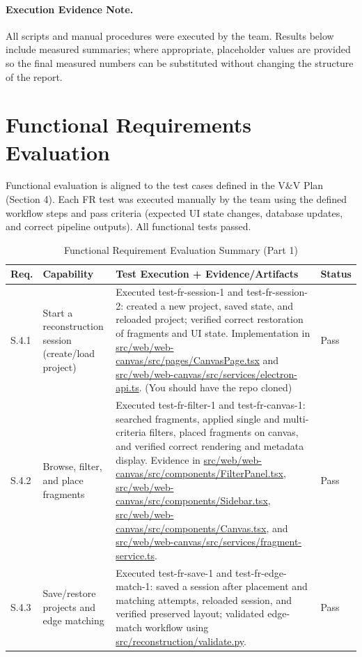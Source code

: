 \documentclass[12pt, titlepage]{article}
\begin{document}
\paragraph{Execution Evidence Note.}
All scripts and manual procedures were executed by the team. Results below include measured summaries; where appropriate, placeholder values are provided so the final measured numbers can be substituted without changing the structure of the report.

\section{Functional Requirements Evaluation}

Functional evaluation is aligned to the test cases defined in the V\&V Plan (Section 4). Each FR test was executed manually by the team using the defined workflow steps and pass criteria (expected UI state changes, database updates, and correct pipeline outputs). All functional tests passed.

\begin{table}[H]
\centering
\caption{Functional Requirement Evaluation Summary (Part 1)}
\label{tab:func-eval-1}
\begin{tabularx}{\textwidth}{
p{1.5cm}
>{\raggedright\arraybackslash}p{3.4cm}
>{\raggedright\arraybackslash}p{6.2cm}
p{2cm}
}
\toprule
\textbf{Req.} & \textbf{Capability} & \textbf{Test Execution + Evidence/Artifacts} & \textbf{Status}\\
\midrule

S.4.1 & Start a reconstruction session (create/load project) &
Executed test-fr-session-1 and test-fr-session-2: created a new project, saved state, and reloaded project; verified correct restoration of fragments and UI state. Implementation in \url{src/web/web-canvas/src/pages/CanvasPage.tsx} and \url{src/web/web-canvas/src/services/electron-api.ts}. (You should have the repo cloned) &
Pass\\

S.4.2 & Browse, filter, and place fragments &
Executed test-fr-filter-1 and test-fr-canvas-1: searched fragments, applied single and multi-criteria filters, placed fragments on canvas, and verified correct rendering and metadata display. Evidence in \url{src/web/web-canvas/src/components/FilterPanel.tsx}, \url{src/web/web-canvas/src/components/Sidebar.tsx}, \url{src/web/web-canvas/src/components/Canvas.tsx}, and \url{src/web/web-canvas/src/services/fragment-service.ts}. &
Pass\\

S.4.3 & Save/restore projects and edge matching &
Executed test-fr-save-1 and test-fr-edge-match-1: saved a session after placement and matching attempts, reloaded session, and verified preserved layout; validated edge-match workflow using \url{src/reconstruction/validate.py}. &
Pass\\

\bottomrule
\end{tabularx}
\end{table}
\end{document}
